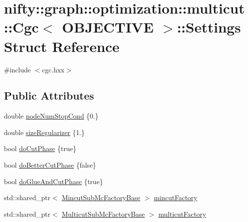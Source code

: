 \hypertarget{structnifty_1_1graph_1_1optimization_1_1multicut_1_1Cgc_1_1Settings}{}\section{nifty\+:\+:graph\+:\+:optimization\+:\+:multicut\+:\+:Cgc$<$ O\+B\+J\+E\+C\+T\+I\+V\+E $>$\+:\+:Settings Struct Reference}
\label{structnifty_1_1graph_1_1optimization_1_1multicut_1_1Cgc_1_1Settings}


{\ttfamily \#include $<$cgc.\+hxx$>$}

\subsection*{Public Attributes}
\begin{DoxyCompactItemize}
\item 
double \hyperlink{structnifty_1_1graph_1_1optimization_1_1multicut_1_1Cgc_1_1Settings_a6548eeee6ce416e6d9c55304617f4a7a}{node\+Num\+Stop\+Cond} \{0.\}
\item 
double \hyperlink{structnifty_1_1graph_1_1optimization_1_1multicut_1_1Cgc_1_1Settings_afdadff9816d3e4ea88dc64b035380bc6}{size\+Regularizer} \{1.\}
\item 
bool \hyperlink{structnifty_1_1graph_1_1optimization_1_1multicut_1_1Cgc_1_1Settings_a8a31328292f57b82bcc239ce2d59b5aa}{do\+Cut\+Phase} \{true\}
\item 
bool \hyperlink{structnifty_1_1graph_1_1optimization_1_1multicut_1_1Cgc_1_1Settings_ac7ad840411e8c31aef71822a0edf1803}{do\+Better\+Cut\+Phase} \{false\}
\item 
bool \hyperlink{structnifty_1_1graph_1_1optimization_1_1multicut_1_1Cgc_1_1Settings_aefc9e01a0efcbcde3492a21b5fc4b33d}{do\+Glue\+And\+Cut\+Phase} \{true\}
\item 
std\+::shared\+\_\+ptr$<$ \hyperlink{classnifty_1_1graph_1_1optimization_1_1multicut_1_1Cgc_ac1c5595cf075e7850bb42a4909dd74c2}{Mincut\+Sub\+Mc\+Factory\+Base} $>$ \hyperlink{structnifty_1_1graph_1_1optimization_1_1multicut_1_1Cgc_1_1Settings_a6738ad90cb7fce9545fd571dd2db3397}{mincut\+Factory}
\item 
std\+::shared\+\_\+ptr$<$ \hyperlink{classnifty_1_1graph_1_1optimization_1_1multicut_1_1Cgc_a6d51da2980311e5646e75fc433b4f8fb}{Multicut\+Sub\+Mc\+Factory\+Base} $>$ \hyperlink{structnifty_1_1graph_1_1optimization_1_1multicut_1_1Cgc_1_1Settings_a9f195bc5037accb73cd9d975c1b222f5}{multicut\+Factory}
\end{DoxyCompactItemize}



